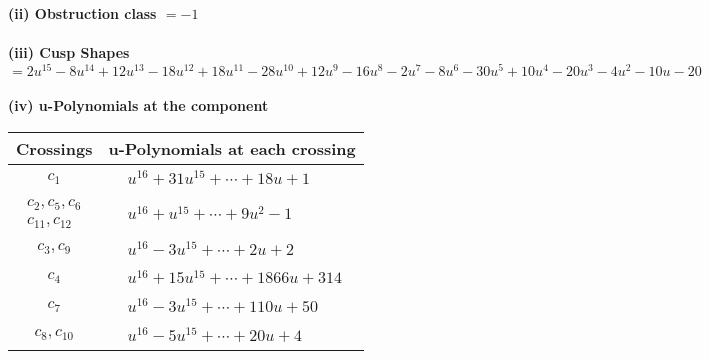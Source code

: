 \documentclass[1p]{elsarticle_modified}
\theoremstyle{definition}
\begin{document}
\flushleft \textbf{(ii) Obstruction class $= -1$}\\~\\
\flushleft \textbf{(iii) Cusp Shapes $= 2 u^{15}-8 u^{14}+12 u^{13}-18 u^{12}+18 u^{11}-28 u^{10}+12 u^9-16 u^8-2 u^7-8 u^6-30 u^5+10 u^4-20 u^3-4 u^2-10 u-20$}\\~\\
\newpage\renewcommand{\arraystretch}{1}
\flushleft \textbf{(iv) u-Polynomials at the component}\newline \\
\begin{tabular}{m{50pt}|m{274pt}}
Crossings & \hspace{64pt}u-Polynomials at each crossing \\
\hline $$\begin{aligned}c_{1}\end{aligned}$$&$\begin{aligned}
&u^{16}+31 u^{15}+\cdots+18 u+1
\end{aligned}$\\
\hline $$\begin{aligned}c_{2},c_{5},c_{6}\\c_{11},c_{12}\end{aligned}$$&$\begin{aligned}
&u^{16}+u^{15}+\cdots+9 u^2-1
\end{aligned}$\\
\hline $$\begin{aligned}c_{3},c_{9}\end{aligned}$$&$\begin{aligned}
&u^{16}-3 u^{15}+\cdots+2 u+2
\end{aligned}$\\
\hline $$\begin{aligned}c_{4}\end{aligned}$$&$\begin{aligned}
&u^{16}+15 u^{15}+\cdots+1866 u+314
\end{aligned}$\\
\hline $$\begin{aligned}c_{7}\end{aligned}$$&$\begin{aligned}
&u^{16}-3 u^{15}+\cdots+110 u+50
\end{aligned}$\\
\hline $$\begin{aligned}c_{8},c_{10}\end{aligned}$$&$\begin{aligned}
&u^{16}-5 u^{15}+\cdots+20 u+4
\end{aligned}$\\
\hline
\end{tabular}\\~\\
\end{document}

